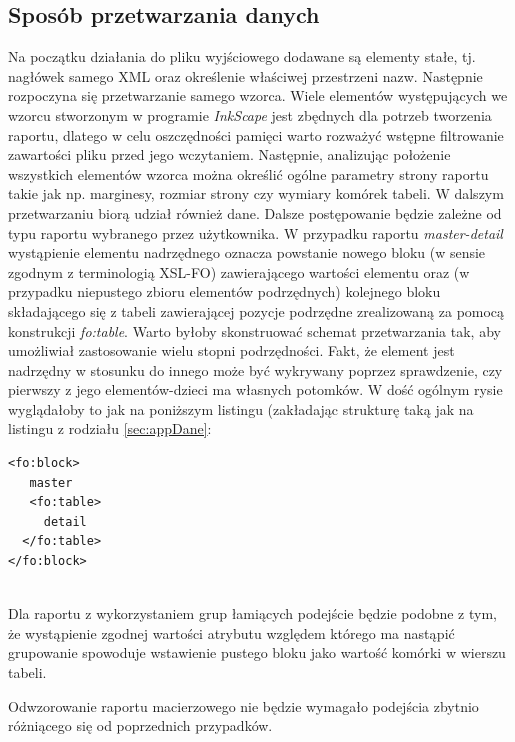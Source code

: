 \documentclass[11pt,a4paper]{article}
\begin{document}
\subsection{Sposób przetwarzania danych}\label{sec:appPrzetwarzanie}
Na początku działania do pliku wyjściowego dodawane są elementy stałe, tj. nagłówek samego XML oraz określenie właściwej przestrzeni nazw. Następnie rozpoczyna się przetwarzanie samego wzorca. Wiele elementów występujących we wzorcu stworzonym w programie \emph{InkScape} jest zbędnych dla potrzeb tworzenia raportu, dlatego w celu oszczędności pamięci warto rozważyć wstępne filtrowanie zawartości pliku przed jego wczytaniem. Następnie, analizując położenie wszystkich elementów wzorca można określić ogólne parametry strony raportu takie jak np. marginesy, rozmiar strony czy wymiary komórek tabeli. W dalszym przetwarzaniu biorą udział również dane. Dalsze postępowanie będzie zależne od typu raportu wybranego przez użytkownika. W przypadku raportu \emph{master-detail} wystąpienie elementu nadrzędnego oznacza powstanie nowego bloku (w sensie zgodnym z terminologią XSL-FO) zawierającego wartości elementu oraz (w przypadku niepustego zbioru elementów podrzędnych) kolejnego bloku składającego się z tabeli zawierającej pozycje podrzędne zrealizowaną za pomocą konstrukcji \emph{fo:table}. Warto byłoby skonstruować schemat przetwarzania tak, aby umożliwiał zastosowanie wielu stopni podrzędności. Fakt, że element jest nadrzędny w stosunku do innego może być wykrywany poprzez sprawdzenie, czy pierwszy z jego elementów-dzieci ma własnych potomków. W dość ogólnym rysie wyglądałoby to jak na poniższym listingu (zakładając strukturę taką jak na listingu z rodziału \ref{sec:appDane}:\\

\lstset{language=XML}
\begin{lstlisting}[frame=single,caption=Przykładowa struktura pliku XSL-FO,label=strukturaXSL]
<fo:block>
   master
   <fo:table>
     detail
  </fo:table>
</fo:block>


\end{lstlisting}

Dla raportu z wykorzystaniem grup łamiących podejście będzie podobne z tym, że wystąpienie zgodnej wartości atrybutu względem którego ma nastąpić grupowanie spowoduje wstawienie pustego bloku jako wartość komórki w wierszu tabeli.

Odwzorowanie raportu macierzowego nie będzie wymagało podejścia zbytnio różniącego się od poprzednich przypadków.
\end{document}
